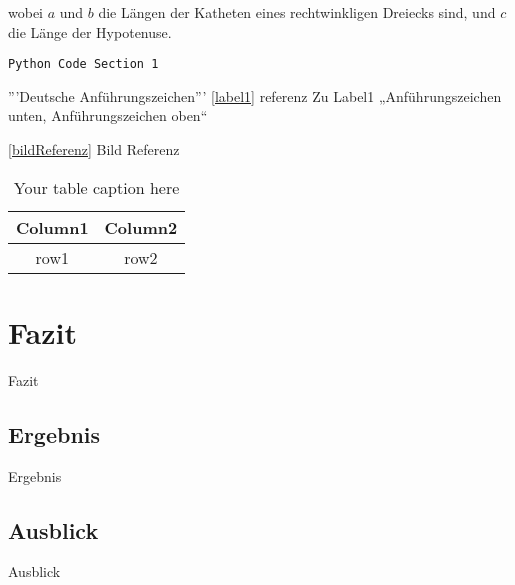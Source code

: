 wobei \(a\) und \(b\) die Längen der Katheten eines rechtwinkligen Dreiecks sind, und \(c\) die Länge der Hypotenuse.



\begin{lstlisting}[caption={Pip Update}, label={lst:upgradePip}]
    Python Code Section 1
\end{lstlisting}


'''Deutsche Anführungszeichen''' \ref{label1} referenz Zu Label1 
„Anführungszeichen unten, Anführungszeichen oben“

\ref{bildReferenz} Bild Referenz

\begin{table}[h]
    \centering
    \begin{tabular}{|c|c|}
    \hline
        \textbf{Column1} & \textbf{Column2} \\ \hline
        row1 & row2 \\ \hline
    \end{tabular}
    \caption{Your table caption here}
    \label{table:1}
\end{table}

\newpage
\section{Fazit}
Fazit
\subsection{Ergebnis}
Ergebnis

\subsection{Ausblick}
Ausblick

\newpage

